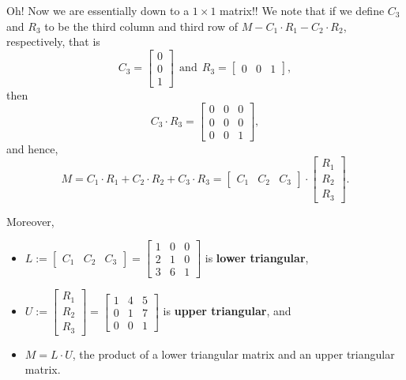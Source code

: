  Oh! Now we are essentially down to a $1 \times 1 $ matrix!!  We note that if we define  
 $C_3$  and $R_3$  to be the third column and third row of $M- C_1 \cdot R_1 - C_2 \cdot R_2$, respectively, that is
$$C_3=\left[\begin{array}{r} 
    0  \\ 0\\ 1  \end{array}  \right]~~\text{and}~~R_3=\left[\begin{array}{rrr} 
   0   &  0   &  1 \end{array}  \right],  $$
   then 
   $$C_3 \cdot R_3 = \left[\begin{array}{rrr} 
       0  &   0  &   0 \\
     0   &  0   &  0 \\
     0   &  0   & 1 \end{array}  \right],
     $$
     and hence,
     $$M = C_1 \cdot R_1 + C_2 \cdot R_2 + C_3 \cdot R_3 = \left[\begin{array}{rrr} 
   C_1   &  C_2   &  C_3\end{array}  \right] \cdot \left[\begin{array}{r} 
    R_1  \\ R_2\\ R_3 \end{array}  \right]. $$
    
    Moreover, 
    \begin{itemize}
        \item  $L:=\left[\begin{array}{rrr} 
   C_1   &  C_2   &  C_3\end{array}  \right] = 
   \left[\begin{array}{rrr} 
       1  &   0  &   0 \\
    2  &  1   &  0 \\
     3  &  6   & 1 \end{array}  \right]$ is \textbf{lower triangular}, 
     \item $U:=   \left[\begin{array}{r} 
    R_1 \\ R_2\\ R_3  \end{array}  \right] = \left[\begin{array}{rrr} 
     1  &   4   &  5 \\
     0  &   1   &  7 \\
     0  &   0   &  1 \end{array}  \right]$ is \textbf{upper triangular}, and \\
     \item $M=L \cdot U$, the product of a lower triangular matrix and an upper triangular matrix.
    \end{itemize}
    
